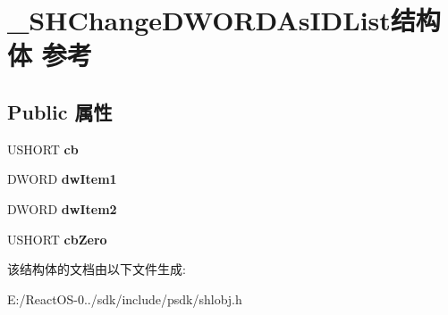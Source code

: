 \hypertarget{struct___s_h_change_d_w_o_r_d_as_i_d_list}{}\section{\+\_\+\+S\+H\+Change\+D\+W\+O\+R\+D\+As\+I\+D\+List结构体 参考}
\label{struct___s_h_change_d_w_o_r_d_as_i_d_list}
\subsection*{Public 属性}
\begin{DoxyCompactItemize}
\item 
\mbox{\label{struct___s_h_change_d_w_o_r_d_as_i_d_list_afb98683ffe7f9705ee220ca3227f4e54}} 
U\+S\+H\+O\+RT {\bfseries cb}
\item 
\mbox{\label{struct___s_h_change_d_w_o_r_d_as_i_d_list_af5ea1b5060162203a0b845ffeb341097}} 
D\+W\+O\+RD {\bfseries dw\+Item1}
\item 
\mbox{\label{struct___s_h_change_d_w_o_r_d_as_i_d_list_a15c3cdabc21e77cb0b4b151c45f5d1ed}} 
D\+W\+O\+RD {\bfseries dw\+Item2}
\item 
\mbox{\label{struct___s_h_change_d_w_o_r_d_as_i_d_list_a6446b8370cb1b007c55c4590d346865a}} 
U\+S\+H\+O\+RT {\bfseries cb\+Zero}
\end{DoxyCompactItemize}


该结构体的文档由以下文件生成\+:\begin{DoxyCompactItemize}
\item 
E\+:/\+React\+O\+S-\/0../sdk/include/psdk/shlobj.\+h\end{DoxyCompactItemize}
